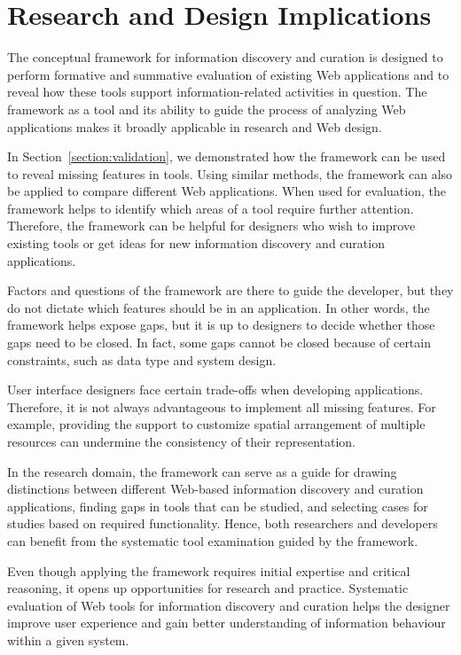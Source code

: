 \documentclass{sigchi}
\begin{document}
\section{Research and Design Implications}
\label{section:implications}
The conceptual framework for information discovery and curation is designed to perform formative and summative evaluation of existing Web applications and to reveal how these tools support information-related activities in question. The framework as a tool and its ability to guide the process of analyzing Web applications makes it broadly applicable in research and Web design. 

In Section~\ref{section:validation}, we demonstrated how the framework can be used to reveal missing features in tools. Using similar methods, the framework can also be applied to compare different Web applications. When used for evaluation, the framework helps to identify which areas of a tool require further attention. Therefore, the framework can be helpful for designers who wish to improve existing tools or get ideas for new information discovery and curation applications. 

Factors and questions of the framework are there to guide the developer, but they do not dictate which features should be in an application. In other words, the framework helps expose gaps, but it is up to designers to decide whether those gaps need to be closed. In fact, some gaps cannot be closed because of certain constraints, such as data type and system design.

User interface designers face certain trade-offs when developing applications. Therefore, it is not always advantageous to implement all missing features. For example, providing the support to customize spatial arrangement of multiple resources can undermine the consistency of their representation. 

In the research domain, the framework can serve as a guide for drawing distinctions between different Web-based information discovery and curation applications, finding gaps in tools that can be studied, and selecting cases for studies based on required functionality. Hence, both researchers and developers can benefit from the systematic tool examination guided by the framework.

Even though applying the framework requires initial expertise and critical reasoning, it opens up opportunities for research and practice. Systematic evaluation of Web tools for information discovery and curation helps the designer improve user experience and gain better understanding of information behaviour within a given system. 
\end{document}

